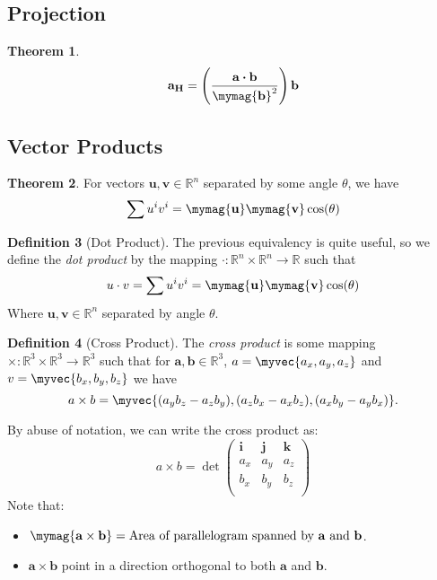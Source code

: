 \documentclass[11pt]{article}
\theoremstyle{definition}
\newtheorem{theorem}{Theorem}[section]
\newtheorem{definition}[theorem]{Definition}
\begin{document}
\subsection{Projection}
\begin{theorem}
    $$\mathbf{a_H} = \left(\frac{\mathbf{a}
\boldsymbol{\cdot}\mathbf{b}}{\mymag{\mathbf{b}}^2}\right)\mathbf{b}$$
\end{theorem}
\subsection{Vector Products}
\begin{theorem}
    For vectors $\mathbf{u},\mathbf{v} \in \mathbb{R}^n$ separated by some
    angle $\theta$, we have
    \begin{equation*}
        \sum{u^i v^i} = \mymag{\mathbf{u}}\mymag{\mathbf{v}}\cos(\theta)
    \end{equation*}
\end{theorem}
\begin{definition}[Dot Product]
    The previous equivalency is quite useful, so we define the \emph{dot
    product} by the mapping $\boldsymbol{\cdot} : \mathbb{R}^n \times
    \mathbb{R}^n \to \mathbb{R}$ such that
    \begin{equation*}
        u \cdot v = \sum{u^i v^i} = \mymag{\mathbf{u}}\mymag{\mathbf{v}}\cos(\theta)
    \end{equation*}
    Where $\mathbf{u},\mathbf{v} \in \mathbb{R}^n$ separated by angle
    $\theta$.
\end{definition}
\begin{definition}[Cross Product]
    The \emph{cross product} is some mapping $\times : \mathbb{R}^3 \times
    \mathbb{R}^3 \to \mathbb{R}^3$ such that for $\mathbf{a,b} \in
    \mathbb{R}^3$, $a = \myvec{a_x,a_y,a_z}$ and $v = \myvec{b_x,b_y,b_z}$
    we have
    \begin{equation*}
        a \times b = \myvec{(a_y b_z - a_z b_y), (a_z b_x - a_x b_z), (a_x
        b_y - a_y b_x)}.
    \end{equation*}
\end{definition}
By abuse of notation, we can write the cross product as:
\begin{equation*}
    a \times b = \det
    \begin{pmatrix} 
    \mathbf{i}       & \mathbf{j}   & \mathbf{k}   \\
    a_x              & a_y          & a_z          \\
    b_x              & b_y          & b_z          \\
    \end{pmatrix}
\end{equation*}
Note that:
\begin{itemize}
    \item $\mymag{\mathbf{a} \times \mathbf{b}} = \text{Area of
parallelogram spanned by } \mathbf{a} \text{ and } \mathbf{b}$.
    \item $\mathbf{a} \times \mathbf{b}$ point in a direction
        orthogonal to both $\mathbf{a}$ and $\mathbf{b}$.
\end{itemize}
\end{document}
